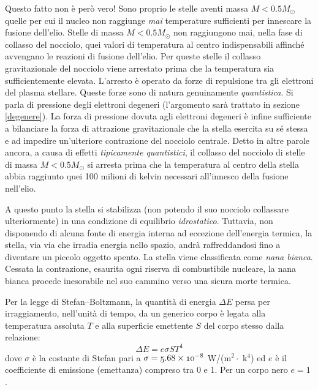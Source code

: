 \par
Questo fatto non è però vero! Sono proprio le stelle aventi massa $M < 0.5 M_{\odot}$ quelle per cui il nucleo non raggiunge \emph{mai} temperature sufficienti per innescare la fusione dell'elio.
Stelle di massa $M < 0.5 M_{\odot}$ non raggiungono mai, nella fase di collasso del nocciolo, quei valori di temperatura al centro indispensabili affinché avvengano le reazioni di fusione dell'elio.
Per queste stelle il collasso gravitazionale del nocciolo viene arrestato prima che la temperatura sia sufficientemente elevata. L'arresto è operato da forze di repulsione tra gli elettroni del plasma stellare. Queste forze sono di natura genuinamente \emph{quantistica}. Si parla di pressione degli elettroni degeneri (l'argomento sar\`{a} trattato in sezione \ref{degenere}). La forza di pressione dovuta agli elettroni degeneri è infine sufficiente a bilanciare la forza di attrazione gravitazionale che la stella esercita su sé stessa e ad impedire un'ulteriore contrazione del nocciolo centrale.
Detto in altre parole ancora, a causa di effetti \emph{tipicamente quantistici}, il collasso del nocciolo di stelle di massa $M<0.5M_{\odot}$ si arresta prima che la temperatura al centro della stella abbia raggiunto quei 100 milioni di kelvin necessari all'innesco della fusione nell'elio.
\par
A questo punto la stella si stabilizza (non potendo il suo nocciolo collassare ulteriormente) in una condizione di equilibrio \emph{idrostatico}.
Tuttavia, non disponendo di alcuna fonte di energia interna ad eccezione dell'energia termica, la stella, via via che irradia energia nello spazio, andr\`{a} raffreddandosi fino a diventare un piccolo oggetto spento.
La stella viene classificata come \emph{nana bianca}.
Cessata la contrazione, esaurita ogni riserva di combustibile nucleare, la nana bianca procede inesorabile nel suo cammino verso una sicura morte termica.
\par
Per la legge di Stefan--Boltzmann, la quantit\`{a} di energia $\Delta E$ persa per irraggiamento, nell'unit\`{a} di tempo, da un generico corpo è legata alla temperatura assoluta $T$ e alla superficie emettente $S$ del corpo stesso dalla relazione:
\begin{equation}
\Delta E = e \sigma S T^{4}
\end{equation}
dove $\sigma$ è la costante di Stefan pari a $\sigma=\mathnormal{5.68 \times 10^{-8}}$ W/(m$^{2}\cdot$ k$^{4}$) ed $e$ è il coefficiente di emissione (emettanza) compreso tra 0 e 1. Per un corpo nero $e=1$ \Cite{caf}.
